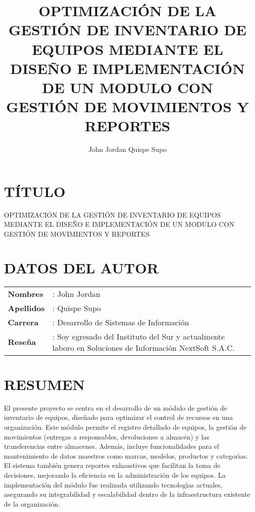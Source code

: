 \documentclass[stu, 12pt, letterpaper, donotrepeattitle, floatsintext, natbib]{apa7}
\title{\large OPTIMIZACI\'ON DE LA GESTI\'ON DE INVENTARIO DE EQUIPOS MEDIANTE EL DISE\~{N}O E IMPLEMENTACI\'ON DE UN MODULO CON GESTI\'ON DE MOVIMIENTOS Y REPORTES}
\author{John Jordan Quispe Supo}
\begin{document}
\maketitle

\renewcommand\contentsname{\large\'Indice}
\tableofcontents
\setcounter{tocdepth}{2}
\newpage
\renewcommand\listfigurename{\large\'Indice de figuras}
\listoffigures
\newpage
\renewcommand\listtablename{\large\'Indice de tablas}
\listoftables
\newpage


\section{\large T\'ITULO}
\noindent OPTIMIZACI\'ON DE LA GESTI\'ON DE INVENTARIO DE EQUIPOS MEDIANTE EL DISE\~{N}O E IMPLEMENTACI\'ON DE UN MODULO CON GESTI\'ON DE MOVIMIENTOS Y REPORTES

\section{\large DATOS DEL AUTOR}
\begin{tabular}{@{} p{2cm} p{12.8cm} @{}}
    \textbf{Nombres}   & : John Jordan                                                                                            \\
    \textbf{Apellidos} & : Quispe Supo                                                                                            \\
    \textbf{Carrera}   & : Desarrollo de Sistemas de Informaci\'on                                                                \\
    \textbf{Reseña}    & : Soy egresado del Instituto del Sur y actualmente laboro en Soluciones de Informaci\'on NextSoft S.A.C. \\
\end{tabular}
\newline

\section{\large RESUMEN}
El presente proyecto se centra en el desarrollo de un m\'odulo de gesti\'on de inventario de equipos, diseñado para optimizar el control de recursos en una organizaci\'on. Este m\'odulo permite el registro
detallado de equipos, la gesti\'on de movimientos (entregas a responsables, devoluciones a almac\'en) y las transferencias entre almacenes. Adem\'as, incluye funcionalidades para el mantenimiento de datos
maestros como marcas, modelos, productos y categor\'{\i}as. El sistema tambi\'en genera reportes exhaustivos que facilitan la toma de decisiones, mejorando la eficiencia en la administraci\'on de los equipos.
La implementaci\'on del m\'odulo fue realizada utilizando tecnolog\'{\i}as actuales, asegurando su integrabilidad y escalabilidad dentro de la infraestructura existente de la organizaci\'on.
\end{document}
